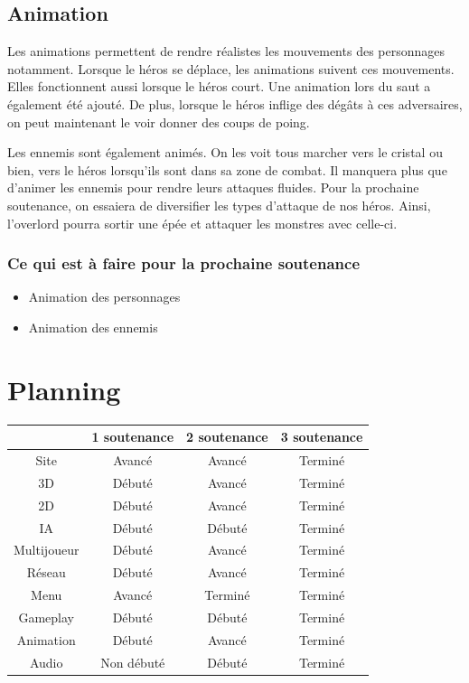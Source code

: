 \documentclass[a4paper, 12pt]{article}
\begin{document}
	\subsection{Animation}
		Les animations permettent de rendre réalistes les mouvements des personnages notamment. Lorsque le héros se déplace, les animations suivent ces mouvements. Elles fonctionnent aussi lorsque le héros court. Une animation lors du saut a également été ajouté. De plus, lorsque le héros inflige des dégâts à ces adversaires, on peut maintenant le voir donner des coups de poing. 
	\par Les ennemis sont également animés. On les voit tous marcher vers le cristal ou bien, vers le héros lorsqu’ils sont dans sa zone de combat.
Il manquera plus que d’animer les ennemis pour rendre leurs attaques fluides. Pour la prochaine soutenance, on essaiera de diversifier les types d’attaque de nos héros. Ainsi, l’overlord pourra sortir une épée et attaquer les monstres avec celle-ci.

\subsubsection*{Ce qui est à faire pour la prochaine soutenance}
\begin{itemize}
\item Animation des personnages
\item Animation des ennemis
\end{itemize}

\section{Planning}
	\begin{tabular}{|c||c|c|c|}
		\hline
		& 1\iere{} soutenance & 2\ieme{} soutenance & 3\ieme{} soutenance \\
		\hline
		Site &  Avancé & Avancé & Terminé \\
		\hline
		3D & Débuté & Avancé & Terminé \\
		\hline
		2D & Débuté & Avancé & Terminé \\
		\hline
		IA & Débuté & Débuté & Terminé\\
		\hline
		Multijoueur & Débuté & Avancé & Terminé\\
		\hline
		Réseau & Débuté & Avancé & Terminé\\
		\hline
		Menu & Avancé & Terminé & Terminé \\
		\hline
		Gameplay & Débuté & Débuté & Terminé\\
		\hline
		Animation & Débuté & Avancé & Terminé\\		
		\hline
		Audio & Non débuté & Débuté & Terminé\\
		\hline		
	\end{tabular}\\
	\newpage
\end{document}
